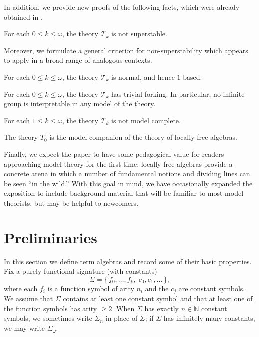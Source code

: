 \documentclass[a4paper,11pt]{article}
\begin{document}
In addition, we provide new proofs of the following facts, which were already obtained in \cite{Belegradek1988LocallyFree}.

\begin{theorem}
For each \(0\leq k\leq \omega\), the theory \(\mathcal{T}_k\) is not superstable.
\end{theorem}

Moreover, we formulate a general criterion for non-superstability which appears to apply in a broad range of analogous contexts.

\begin{theorem}
For each \(0\leq k\leq \omega\), the theory \(\mathcal{T}_k\) is normal, and hence \(1\)-based.
\end{theorem}

\begin{theorem}
For each \(0\leq k\leq \omega\), the theory \(\mathcal{T}_k\) has trivial forking. In particular, no infinite group is interpretable in any model of the theory.
\end{theorem}

\begin{theorem}
For each \(1\leq k\leq \omega\), the theory \(\mathcal{T}_k\) is not model complete.
\end{theorem}

\begin{theorem}
The theory \(T_0\) is the model companion of the theory of locally free algebras.
\end{theorem}

Finally, we expect the paper to have some pedagogical value for readers approaching model theory for the first time: locally free algebras provide a concrete arena in which a number of fundamental notions and dividing lines can be seen ``in the wild.'' With this goal in mind, we have occasionally expanded the exposition to include background material that will be familiar to most model theorists, but may be helpful to newcomers. 



\section{Preliminaries}\label{Prel}


In this section we define term algebras and record some of their basic properties. Fix a purely functional signature (with constants)
\[
\Sigma=\{\,f_0,\ldots,f_k,\; c_0,c_1,\ldots\,\},
\]
where each $f_i$ is a function symbol of arity $n_i$ and the $c_j$ are constant symbols. We assume that $\Sigma$ contains at least one constant symbol and that at least one of the function symbols has arity $\geq 2$. When $\Sigma$ has exactly $n\in\mathbb{N}$ constant symbols, we sometimes write $\Sigma_n$ in place of $\Sigma$; if $\Sigma$ has infinitely many constants, we may write $\Sigma_\omega$.
\end{document}

